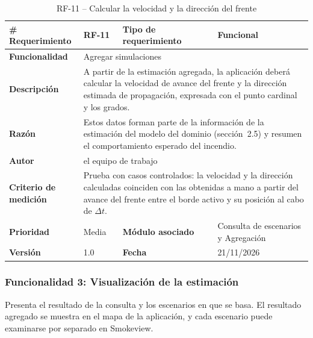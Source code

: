 \begin{longtable}{|p{\rqA}|p{\rqB}|p{\rqC}|p{\rqD}|}
  \caption{RF-11 -- Calcular la velocidad y la dirección del frente}\label{tab:rf-11}\tabularnewline
  \hline
  \textbf{\# Requerimiento} & RF-11 & \raggedright\textbf{Tipo de requerimiento} & Funcional\tabularnewline\hline
  \raggedright\textbf{Funcionalidad} & \multicolumn{3}{p{\rqBCD}|}{Agregar simulaciones}\tabularnewline\hline
  \endfirsthead
  \textbf{Descripción} & \multicolumn{3}{p{\rqBCD}|}{A partir de la estimación agregada, la aplicación deberá calcular la velocidad de avance del frente y la dirección estimada de propagación, expresada con el punto cardinal y los grados.}\tabularnewline\hline
  \textbf{Razón} & \multicolumn{3}{p{\rqBCD}|}{Estos datos forman parte de la información de la estimación del modelo del dominio (sección~2.5) y resumen el comportamiento esperado del incendio.}\tabularnewline\hline
  \textbf{Autor} & \multicolumn{3}{p{\rqBCD}|}{el equipo de trabajo}\tabularnewline\hline
  \raggedright\textbf{Criterio de medición} & \multicolumn{3}{p{\rqBCD}|}{Prueba con casos controlados: la velocidad y la dirección calculadas coinciden con las obtenidas a mano a partir del avance del frente entre el borde activo y su posición al cabo de $\Delta t$.}\tabularnewline\hline
  \textbf{Prioridad} & Media & \raggedright\textbf{Módulo asociado} & Consulta de escenarios y Agregación\tabularnewline\hline
  \textbf{Versión} & 1.0 & \textbf{Fecha} & 21/11/2026\tabularnewline\hline
\end{longtable}

\subsubsection{Funcionalidad 3: Visualización de la estimación}

Presenta el resultado de la consulta y los escenarios en que se basa. El resultado agregado se muestra en el mapa de la aplicación, y cada escenario puede examinarse por separado en Smokeview.


